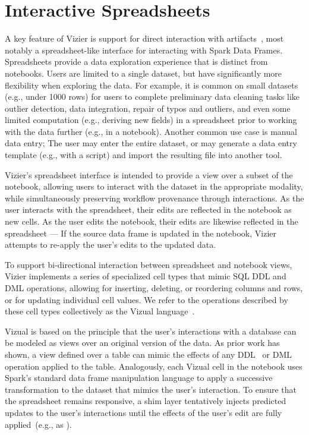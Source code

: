 \section{Interactive Spreadsheets}
\label{sec:spreadsheets}

A key feature of Vizier is support for direct interaction with artifacts~\cite{BS20}, most notably a spreadsheet-like interface for interacting with Spark Data Frames.
Spreadsheets provide a data exploration experience that is distinct from notebooks.
Users are limited to a single dataset, but have significantly more flexibility when exploring the data.
For example, it is common on small datasets (e.g., under 1000 rows) for users to complete preliminary data cleaning tasks like outlier detection, data integration, repair of typos and outliers, and even some limited computation (e.g., deriving new fields) in a spreadsheet prior to working with the data further (e.g., in a notebook).
Another common use case is manual data entry; The user may enter the entire dataset, or may generate a data entry template (e.g., with a script) and import the resulting file into another tool.

Vizier's spreadsheet interface is intended to provide a view over a subset of the notebook, allowing users to interact with the dataset in the appropriate modality, while simultaneously preserving workflow provenance  through interactions.
As the user interacts with the spreadsheet, their edits are reflected in the notebook as new cells.
As the user edits the notebook, their edits are likewise reflected in the spreadsheet --- If the source data frame is updated in the notebook, Vizier attempts to re-apply the user's edits to the updated data.

%
To support bi-directional interaction between spreadsheet and notebook views, Vizier implements a series of specialized cell types that mimic SQL DDL and DML operations, allowing for inserting, deleting, or reordering columns and rows, or for updating individual cell values.
We refer to the operations described by these cell types collectively as the Vizual language~\cite{FG16,BS20}.

Vizual is based on the principle that the user's interactions with a database  can be modeled as views over an original version of the data.
As prior work has shown, a view defined over a table can mimic the effects of any DDL~\cite{DBLP:journals/pvldb/CurinoMZ08} or DML~\cite{DBLP:journals/pvldb/NiuALFZGKLG17} operation applied to the table.
Analogously, each Vizual cell in the notebook uses Spark's standard data frame manipulation language to apply a successive transformation to the dataset that mimics the user's interaction.
To ensure that the spreadsheet remains responsive, a shim layer tentatively injects predicted updates to the user's interactions until the effects of the user's edit are fully applied~(e.g., as \cite{DBLP:conf/icde/GuptaDGUW09}).


